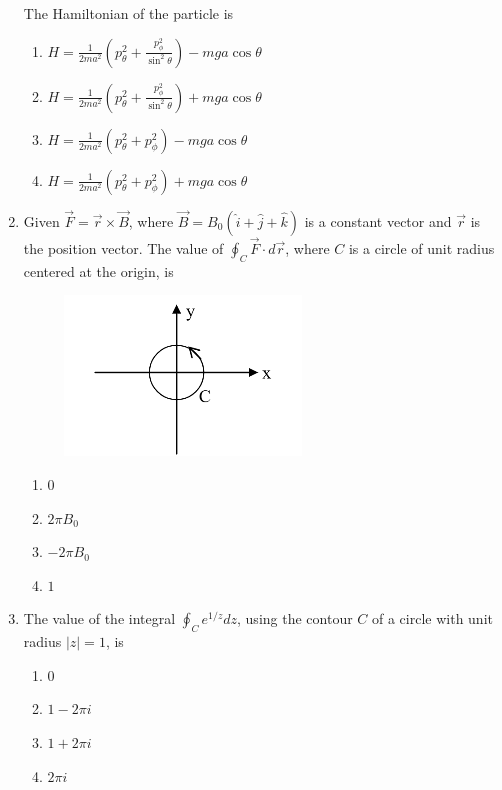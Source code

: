 \documentclass[journal,12pt,onecolumn]{IEEEtran}
\theoremstyle{remark}
\begin{document}
\begin{enumerate}
The Hamiltonian of the particle is
\begin{multicols}{2}
\begin{enumerate}
\item $H = \frac{1}{2 m a^{2}}\left( p_{\theta}^{2} + \frac{p_{\phi}^{2}}{\sin^{2}\theta} \right) - m g a \cos\theta$
\item $H = \frac{1}{2 m a^{2}}\left( p_{\theta}^{2} + \frac{p_{\phi}^{2}}{\sin^{2}\theta} \right) + m g a \cos\theta$
\item $H = \frac{1}{2 m a^{2}}\left( p_{\theta}^{2} + p_{\phi}^{2} \right) - m g a \cos\theta$
\item $H = \frac{1}{2 m a^{2}}\left( p_{\theta}^{2} + p_{\phi}^{2} \right) + m g a \cos\theta$
\end{enumerate}
\end{multicols}

\item Given $\vec{F} = \vec{r} \times \vec{B}$, where $\vec{B} = B_{0}(\hat{i} + \hat{j} + \hat{k})$ is a constant vector and $\vec{r}$ is the position vector. The value of $\oint_{C} \vec{F} \cdot d\vec{r}$, where $C$ is a circle of unit radius centered at the origin, is
\begin{figure}[H]
    \centering
    \includegraphics[width=0.25\columnwidth]{fig/Q43.png}
    \label{fig:Q43}
\end{figure}
\begin{multicols}{4}
\begin{enumerate}
\item $0$
\item $2\pi B_{0}$
\item $-2\pi B_{0}$
\item $1$
\end{enumerate}
\end{multicols}

\item The value of the integral $\oint_{C} e^{1/z} dz$, using the contour $C$ of a circle with unit radius $|z| = 1$, is
\begin{multicols}{4}
\begin{enumerate}
\item $0$
\item $1 - 2\pi i$
\item $1 + 2\pi i$
\item $2\pi i$
\end{enumerate}
\end{multicols}


\end{enumerate}
\end{document}
